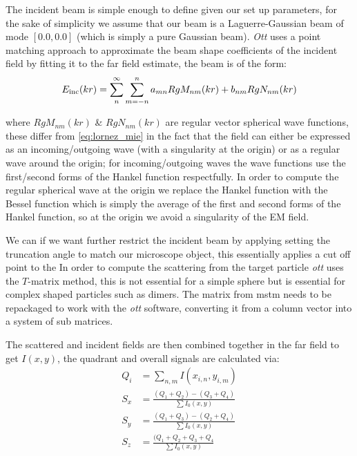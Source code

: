 The incident beam is simple enough to define given our set up parameters, 
for the sake of simplicity we assume that our beam is a Laguerre-Gaussian 
beam of mode $[0.0, 0.0]$ (which is simply a pure Gaussian beam). 
\textit{Ott} uses a point matching approach to approximate the beam shape 
coefficients of the incident field by fitting it to the far field estimate, 
the beam is of the form:
\begin{align}
	E_{\rm inc}(kr)=\sum^\infty_n\sum^n_{m=-n}a_{mn}RgM_{nm}(kr)+b_{nm}RgN_{nm}(kr)
\end{align}

where $RgM_{nm}(kr)$ \& $RgN_{nm}(kr)$ are regular vector spherical wave 
functions, these differ from \eqref{eq:lornez_mie} in the fact that the 
field can either be expressed as an incoming/outgoing wave (with a 
singularity at the origin) or as a regular wave around the origin; for 
incoming/outgoing waves the wave functions use the first/second forms of 
the Hankel function respectfully. In order to compute the regular spherical 
wave at the origin we replace the Hankel function with the Bessel function 
which is simply the average of the first and second forms of the Hankel 
function, so at the origin we avoid a singularity of the EM field.  

We can if we want further restrict the incident beam by applying setting 
the truncation angle to match our microscope object, this essentially 
applies a cut off point to the In order to compute the scattering from 
the target particle \textit{ott} uses the $T$-matrix method, this is not 
essential for a simple sphere but is essential for complex shaped particles 
such as dimers. The matrix from mstm needs to be repackaged to work with the
\textit{ott} software, converting it from a column vector into a system of 
sub matrices. 

The scattered and incident fields are then combined together 
in the far field to get $I(x,y)$, the quadrant and overall signals are 
calculated via:
\begin{align}
	Q_i &= \sum_{n,m} I(x_{i,n}, y_{i,m}) \\
	S_{x} &= \frac{(Q_1+Q_2)-(Q_3+Q_4)}{\sum I_0(x,y)} \\
	S_{y} &= \frac{(Q_1+Q_3)-(Q_2+Q_4)}{\sum I_0(x,y)} \\
	S_{z} &= \frac{(Q_1+Q_2+Q_3+Q_4}{\sum I_0(x,y)}
\end{align}

